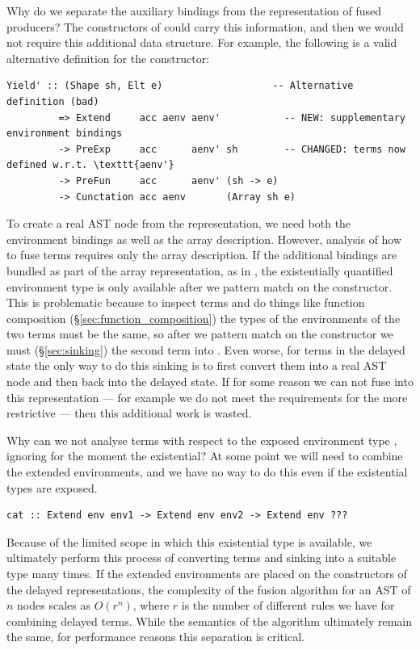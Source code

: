 Why do we separate the auxiliary bindings from the representation of fused
producers? The constructors of  could carry this information,
and then we would not require this additional data structure. For example, the
following is a valid alternative definition for the  constructor:
%
\begin{lstlisting}[style=haskell]
  Yield' :: (Shape sh, Elt e)                   -- Alternative definition (bad)
         => Extend     acc aenv aenv'           -- NEW: supplementary environment bindings
         -> PreExp     acc      aenv' sh        -- CHANGED: terms now defined w.r.t. \texttt{aenv'}
         -> PreFun     acc      aenv' (sh -> e)
         -> Cunctation acc aenv       (Array sh e)
\end{lstlisting}

To create a real AST node from the 
representation, we need both the environment bindings as well as the array
description. However, analysis of how to fuse terms requires only the array
description. If the additional bindings are bundled as part of the array
representation, as in , the existentially quantified environment
type is only available after we pattern match on the constructor. This is
problematic because to inspect terms and do things like function composition
(\S\ref{sec:function_composition}) the types of the environments of the two
terms must be the same, so after we pattern match on the constructor we must
 (\S\ref{sec:sinking}) the second term into . Even worse,
for terms in the delayed state the only way to do this sinking is to first
convert them into a real AST node and then back into the delayed state. If for
some reason we can not fuse into this representation --- for example we do not
meet the requirements for the more restrictive  --- then this
additional work is wasted.

Why can we not analyse terms with respect to the exposed environment type
, ignoring for the moment the existential? At some point we will need
to combine the extended environments, and we have no way to do this even if the
existential types are exposed.
%
\begin{lstlisting}[style=haskell]
cat :: Extend env env1 -> Extend env env2 -> Extend env ???
\end{lstlisting}

Because of the limited scope in which this existential type is available, we
ultimately perform this process of converting terms and sinking into a suitable
type many times. If the extended environments are placed on the constructors of
the delayed representations, the complexity of the fusion algorithm for an AST
of $n$ nodes scales as $O(r^n)$, where $r$ is the number of different rules we
have for combining delayed terms. While the semantics of the algorithm
ultimately remain the same, for performance reasons this separation is critical.


